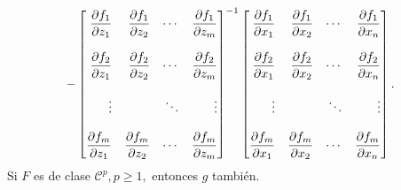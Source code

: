 \begin{theorem}
\[ -\begin{bmatrix*}[r]
                \dif{f_1}{z_1} & \dif{f_1}{z_2} & \cdots & \dif{f_1}{z_m} \\
                               &                &        &                \\
                \dif{f_2}{z_1} & \dif{f_2}{z_2} & \cdots & \dif{f_2}{z_m} \\
                               &                &        &                \\
                \vdots         &                & \ddots & \vdots         \\
                               &                &        &                \\
                \dif{f_m}{z_1} & \dif{f_m}{z_2} & \cdots & \dif{f_m}{z_m}
                \end{bmatrix*}^{-1}
  \begin{bmatrix*}[r]
                \dif{f_1}{x_1} & \dif{f_1}{x_2} & \cdots & \dif{f_1}{x_n} \\
                               &                &        &                \\
                \dif{f_2}{x_1} & \dif{f_2}{x_2} & \cdots & \dif{f_2}{x_n} \\
                               &                &        &                \\
                \vdots         &                & \ddots & \vdots         \\
                               &                &        &                \\
                \dif{f_m}{x_1} & \dif{f_m}{x_2} & \cdots & \dif{f_m}{x_n}
                \end{bmatrix*}.            
 \]
Si $F$ es de clase $\mathcal{C}^p, p \ge 1,$ entonces $g$ tambi\'en.
 
\end{theorem}
